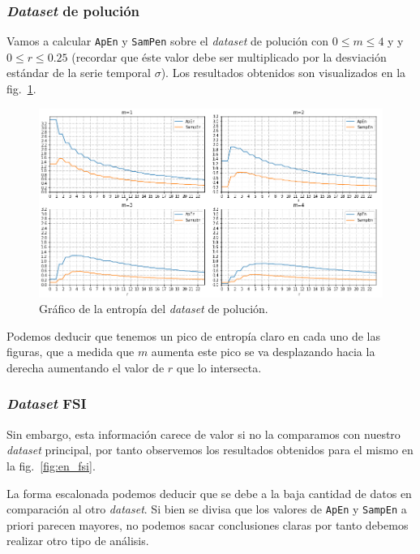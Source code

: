 \documentclass[a4paper,12pt]{article}
\begin{document}
\subsubsection{\textit{Dataset} de polución}
Vamos a calcular \texttt{ApEn} y \texttt{SamPen} sobre el \textit{dataset} de polución con $0 \leq m \leq 4$ y y $0 \leq r \leq 0.25$ (recordar que éste valor debe ser multiplicado por la desviación estándar de la serie temporal $\sigma$). Los resultados obtenidos son visualizados en la fig.~\ref{fig:en_pol}.

\begin{figure}[H]
	\begin{center}
	\includegraphics[width=1\textwidth]{en_pollution.png}
  	\caption{Gráfico de la entropía del \textit{dataset} de polución.}
  	\label{fig:en_pol}
  	\end{center}
\end{figure}

Podemos deducir que tenemos un pico de entropía claro en cada uno de las figuras, que a medida que $m$ aumenta este pico se va desplazando hacia la derecha aumentando el valor de $r$ que lo intersecta.

\subsubsection{\textit{Dataset} FSI}
Sin embargo, esta información carece de valor si no la comparamos con nuestro \textit{dataset} principal, por tanto observemos los resultados obtenidos para el mismo en la fig.~\ref{fig:en_fsi}.

La forma escalonada podemos deducir que se debe a la baja cantidad de datos en comparación al otro \textit{dataset}. Si bien se divisa que los valores de \texttt{ApEn} y \texttt{SampEn} a priori parecen mayores, no podemos sacar conclusiones claras por tanto debemos realizar otro tipo de análisis.
\end{document}
